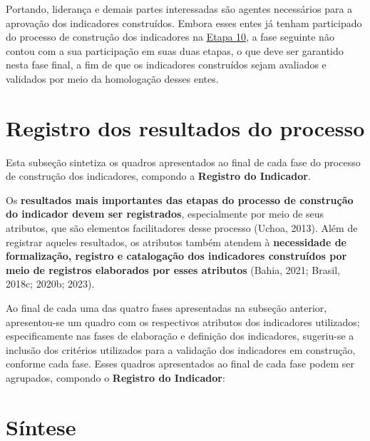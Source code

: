 \documentclass[
  letterpaper,
  DIV=11,
  numbers=noendperiod]{scrreprt}
\begin{document}
Portando, liderança e demais partes interessadas são agentes necessários
para a aprovação dos indicadores construídos. Embora esses entes já
tenham participado do processo de construção dos indicadores na
\href{/o/AZWDclIWFqqJuBEvyQWk/s/ws6bIBOPv2tLRHdwbB7y/~/changes/788/3.-construcao-de-indicadores/3.1-o-processo-de-construcao/2a-fase-elaboracao\#10.-aprovar-preliminarmente-os-indicadores-em-construcao-com-as-partes-interessadas}{Etapa
10}, a fase seguinte não contou com a sua participação em suas duas
etapas, o que deve ser garantido nesta fase final, a fim de que os
indicadores construídos sejam avaliados e validados por meio da
homologação desses entes.

\hypertarget{registro-dos-resultados-do-processo}{%
\chapter{Registro dos resultados do
processo}\label{registro-dos-resultados-do-processo}}

{Esta subseção sintetiza os quadros apresentados ao final de cada fase
do processo de construção dos indicadores, compondo a \textbf{Registro
do Indicador}.}

Os \textbf{resultados mais importantes das etapas do processo de
construção do indicador devem ser registrados}, especialmente por meio
de seus atributos, que são elementos facilitadores desse processo
(Uchoa, 2013). Além de registrar aqueles resultados, os atributos também
atendem à \textbf{necessidade de formalização, registro e catalogação
dos indicadores construídos por meio de registros elaborados por esses
atributos} (Bahia, 2021; Brasil, 2018c; 2020b; 2023).

Ao final de cada uma das quatro fases apresentadas na subseção anterior,
apresentou-se um quadro com os respectivos atributos dos indicadores
utilizados; especificamente nas fases de elaboração e definição dos
indicadores, sugeriu-se a inclusão dos critérios utilizados para a
validação dos indicadores em construção, conforme cada fase. Esses
quadros apresentados ao final de cada fase podem ser agrupados, compondo
o \textbf{Registro do Indicador}:

\hypertarget{suxedntese-2}{%
\chapter*{Síntese}\label{suxedntese-2}}

\end{document}
